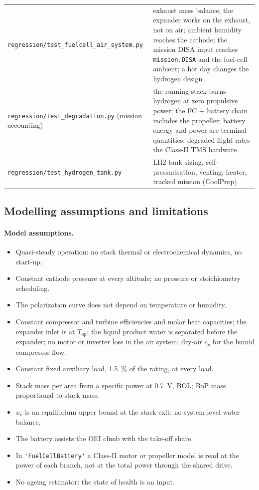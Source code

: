 \documentclass[a4paper,11pt]{article}
\newcommand{\code}[1]{\nolinkurl{#1}}
\newcommand{\fn}[1]{\nolinkurl{#1}}
\begin{document}
\begin{table}[ht]
\begin{tabularx}{\textwidth}{@{}p{5.4cm}X@{}}
\fn{regression/test_fuelcell_air_system.py} & exhaust mass balance; the expander works on the exhaust, not on air; ambient humidity reaches the cathode; the mission DISA input reaches \code{mission.DISA} and the fuel-cell ambient; a hot day changes the hydrogen design \\
\fn{regression/test_degradation.py} (mission accounting) & the running stack burns hydrogen at zero propulsive power; the FC + battery chain includes the propeller; battery energy and power are terminal quantities; degraded flight rates the Class-II TMS hardware \\
\fn{regression/test_hydrogen_tank.py} & LH2 tank sizing, self-pressurisation, venting, heater, tracked mission (CoolProp) \\
\bottomrule
\end{tabularx}
\end{table}

\subsection{Modelling assumptions and limitations}
\label{sec:limitations}

\paragraph{Model assumptions.}
\begin{itemize}
  \item Quasi-steady operation: no stack thermal or electrochemical dynamics, no start-up.
  \item Constant cathode pressure at every altitude; no pressure or stoichiometry scheduling.
  \item The polarization curve does not depend on temperature or humidity.
  \item Constant compressor and turbine efficiencies and molar heat capacities; the expander
  inlet is at $T_\mathrm{op}$; the liquid product water is separated before the expander; no
  motor or inverter loss in the air system; dry-air $c_p$ for the humid compressor flow.
  \item Constant fixed auxiliary load, \SI{1.5}{\percent} of the rating, at every load.
  \item Stack mass per area from a specific power at \SI{0.7}{V}, BOL; BoP mass proportional to
  stack mass.
  \item $x_v$ is an equilibrium upper bound at the stack exit; no system-level water balance.
  \item The battery assists the OEI climb with the take-off share.
  \item In \code{'FuelCellBattery'} a Class-II motor or propeller model is read at the power of
  each branch, not at the total power through the shared drive.
  \item No ageing estimator: the state of health is an input.
\end{itemize}
\end{document}
